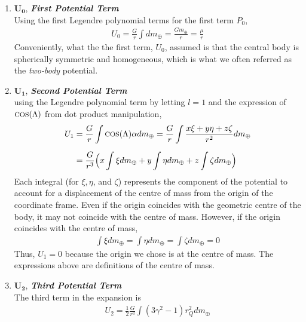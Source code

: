 \begin{multicols}{2}
\begin{enumerate}
    \item $\mathbf{U_0}$, \textit{\textbf{First Potential Term}}\\
    Using the first Legendre polynomial terms for the first term $P_0$, 
    \begin{gather}
        U_0 = \frac{G}{r}\int dm_{\oplus} = \frac{Gm_\oplus}{r}=\frac{\mu}{r}
    \end{gather}
    Conveniently, what the the first term, $U_0$, assumed is that the central body is spherically symmetric and homogeneous, which is what we often referred as the \textit{two-body} potential.
    \vspace*{0.3cm}
    \item $\mathbf{U_1}$, \textit{\textbf{Second Potential Term}}\\
    using the Legendre polynomial term by letting $l=1$ and the expression of $\text{\footnotesize{COS}}(\Lambda)$ from dot product manipulation, 
    \begin{gather}
        \begin{split}
            U_1 &= \frac{G}{r}\int\text{\footnotesize{COS}}(\Lambda)\alpha dm_\oplus = \frac{G}{r}\int\frac{x\xi+y\eta+z\zeta}{r^2}dm_\oplus\\[0.2cm]
                &= \frac{G}{r^3}\Big(x\int\xi dm_\oplus + y\int\eta dm_\oplus + z\int\zeta dm_\oplus\Big)
        \end{split}
    \end{gather}
    Each integral (for $\xi,\eta$, and $\zeta$) represents the component of the potential to account for a displacement of the centre of mass from the origin of the coordinate frame. Even if the origin coincides with the geometric centre of the body, it may not coincide with the centre of mass. However, if the origin coincides with the centre of mass, 
    \begin{gather}
        \int\xi dm_\oplus = \int\eta dm_\oplus = \int\zeta dm_\oplus = 0
    \end{gather}
    Thus, $U_1=0$ because the origin we chose is at the centre of mass. The expressions above are definitions of the centre of mass. 
    \vspace*{0.3cm}
    \item $\mathbf{U_2}$, \textit{\textbf{Third Potential Term}}\\
    The third term in the expansion is
    \begin{gather}
        U_2 = \frac{1}{2}\frac{G}{r^3}\int(3\gamma^2-1)r_Q^2dm_\oplus
    \end{gather}

\end{enumerate}
\end{multicols}
